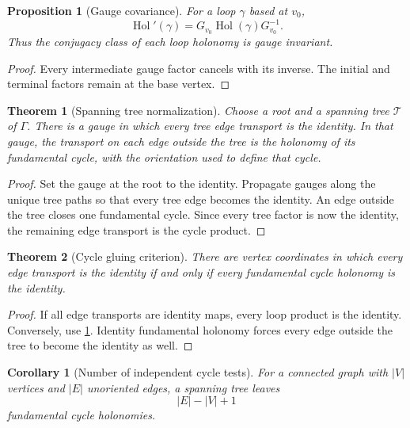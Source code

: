 \documentclass[11pt,a4paper]{article}
\newtheorem{theorem}{Theorem}[section]
\theoremstyle{plain}
\newtheorem{proposition}[proposition]{Proposition}
\newtheorem{corollary}[corollary]{Corollary}
\theoremstyle{definition}
\theoremstyle{remark}
\newcommand{\Hol}{\operatorname{Hol}}
\newcommand{\Tcal}{\mathcal T}
\begin{document}
\begin{proposition}[Gauge covariance]\label{prop:gauge_covariance}
For a loop $\gamma$ based at $v_0$,
\[
\Hol'(\gamma)
=
G_{v_0}\Hol(\gamma)G_{v_0}^{-1}.
\]
Thus the conjugacy class of each loop holonomy is gauge invariant.
\end{proposition}

\begin{proof}
Every intermediate gauge factor cancels with its inverse.  The initial and terminal factors remain at the base vertex.
\end{proof}

\begin{theorem}[Spanning tree normalization]\label{thm:tree_normalization}
Choose a root and a spanning tree $\Tcal$ of $\Gamma$.  There is a gauge in which every tree edge transport is the identity.  In that gauge, the transport on each edge outside the tree is the holonomy of its fundamental cycle, with the orientation used to define that cycle.
\end{theorem}

\begin{proof}
Set the gauge at the root to the identity.  Propagate gauges along the unique tree paths so that every tree edge becomes the identity.  An edge outside the tree closes one fundamental cycle.  Since every tree factor is now the identity, the remaining edge transport is the cycle product.
\end{proof}

\begin{theorem}[Cycle gluing criterion]\label{thm:cycle_gluing}
There are vertex coordinates in which every edge transport is the identity if and only if every fundamental cycle holonomy is the identity.
\end{theorem}

\begin{proof}
If all edge transports are identity maps, every loop product is the identity.  Conversely, use \cref{thm:tree_normalization}.  Identity fundamental holonomy forces every edge outside the tree to become the identity as well.
\end{proof}

\begin{corollary}[Number of independent cycle tests]\label{cor:cycle_number}
For a connected graph with $|V|$ vertices and $|E|$ unoriented edges, a spanning tree leaves
\[
|E|-|V|+1
\]
fundamental cycle holonomies.
\end{corollary}
\end{document}
